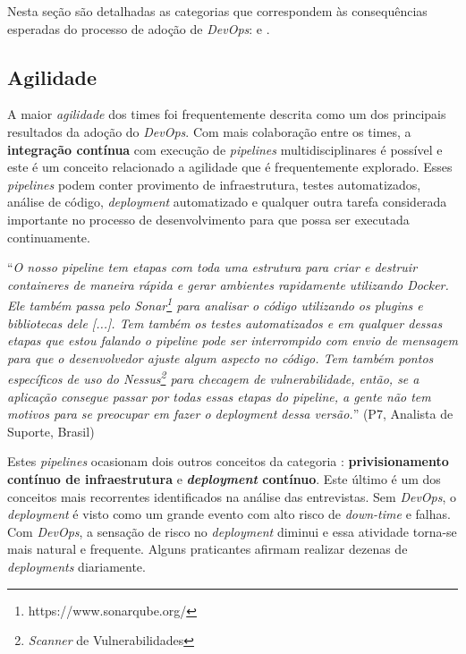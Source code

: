 Nesta seção são detalhadas as categorias que correspondem às consequências
esperadas do processo de adoção de {\it DevOps}:  e .

\subsection{Agilidade}\label{subsecao_agilidade}

A maior {\it agilidade} dos times foi frequentemente descrita como um dos
principais resultados da adoção do {\it DevOps}. Com mais colaboração entre os
times, a {\bf integração contínua} com execução de {\it pipelines}
multidisciplinares é possível e este é um conceito relacionado a agilidade que
é frequentemente explorado. Esses {\it pipelines} podem conter provimento
de infraestrutura, testes automatizados, análise de código, {\it deployment}
automatizado e qualquer outra tarefa considerada importante no processo de
desenvolvimento para que possa ser executada continuamente.

\begin{mq}
``\emph{O nosso pipeline tem etapas com toda uma estrutura para criar e destruir
containeres de maneira rápida e gerar ambientes rapidamente utilizando Docker.
Ele também passa pelo Sonar\footnote{https://www.sonarqube.org/} para
analisar o código utilizando os plugins e bibliotecas dele [...]. Tem também os
testes automatizados e em qualquer dessas etapas que estou falando o pipeline
pode ser interrompido com envio de mensagem para que o desenvolvedor ajuste
algum aspecto no código. Tem também pontos específicos de uso do Nessus\footnote{{\it Scanner} de Vulnerabilidades}
para checagem de vulnerabilidade, então, se a aplicação consegue passar por
todas essas etapas do pipeline, a gente não tem motivos para se preocupar em
fazer o deployment dessa versão.}'' (P7, Analista de Suporte, Brasil)
\end{mq}

Estes {\it pipelines} ocasionam dois outros conceitos da categoria :
{\bf privisionamento contínuo de infraestrutura} e {\bf \emph{deployment} contínuo}.
Este último é um dos conceitos mais recorrentes identificados na análise das
entrevistas. Sem {\it DevOps}, o {\it deployment} é visto como um grande evento
com alto risco de {\it down-time} e falhas. Com {\it DevOps}, a sensação de
risco no {\it deployment} diminui e essa atividade torna-se mais natural e
frequente. Alguns praticantes afirmam realizar dezenas de {\it deployments}
diariamente.

